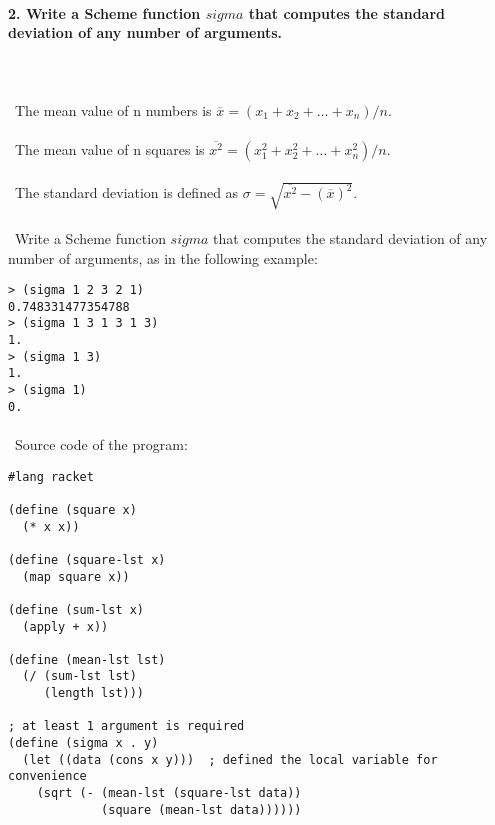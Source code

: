\documentclass{article}
\begin{document}
\paragraph{}\

	\paragraph{2. Write a Scheme function \(sigma\) that computes the standard deviation of any number of arguments.}\
	
\paragraph{}\
		The mean value of n numbers is \(\overline{x} = (x_1 + x_2 + \ldots + x_n) / n\).
\paragraph{}\
		The mean value of n squares is \(\overline{x^2} = (x_1^2 + x_2^2 + \ldots + x_n^2) / n\).
\paragraph{}\
		The standard deviation is defined as \(\sigma = \sqrt{ \overline{x^2} - (\overline{x})^2 } \).
\paragraph{}\
		Write a Scheme function \(sigma\) that computes the standard deviation of any number of arguments, as in the following example:		
		
\begin{verbatim} 
> (sigma 1 2 3 2 1)
0.748331477354788
> (sigma 1 3 1 3 1 3)
1.
> (sigma 1 3)
1.
> (sigma 1)
0.
\end{verbatim}

\paragraph{}\	
Source code of the program:
	
\begin{verbatim} 
#lang racket

(define (square x)
  (* x x))

(define (square-lst x)
  (map square x))

(define (sum-lst x)
  (apply + x))

(define (mean-lst lst)
  (/ (sum-lst lst)
     (length lst)))

; at least 1 argument is required
(define (sigma x . y)
  (let ((data (cons x y)))	; defined the local variable for convenience
    (sqrt (- (mean-lst (square-lst data))
             (square (mean-lst data))))))
\end{verbatim}	
\end{document}
